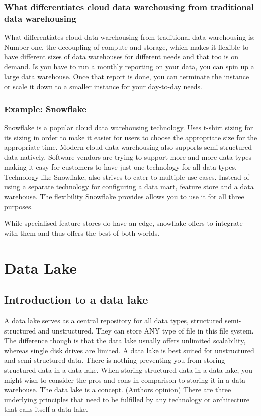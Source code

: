 \documentclass[a4paper, 11pt]{book}
\begin{document}
    \subsubsection{What differentiates cloud data warehousing from traditional data warehousing}
    What differentiates cloud data warehousing from traditional data warehousing is:
    Number one, the decoupling of compute and storage, which makes it flexible to have different sizes of data warehouses for different needs and that too is on demand.
    Is you have to run a monthly reporting on your data, you can spin up a large data warehouse.
    Once that report is done, you can terminate the instance or scale it down to a smaller instance for your day-to-day needs.

    \subsubsection{Example: Snowflake}
    Snowflake is a popular cloud data warehousing technology.
    Uses t-shirt sizing for its sizing in order to make it easier for users to choose the appropriate size for the appropriate time.
    Modern cloud data warehousing also supports semi-structured data natively.
    Software vendors are trying to support more and more data types making it easy for customers to have just one technology for all data types.
    Technology like Snowflake, also strives to cater to multiple use cases.
    Instead of using a separate technology for configuring a data mart, feature store and a data warehouse.
    The flexibility Snowflake provides allows you to use it for all three purposes.

    While specialised feature stores do have an edge, snowflake offers to integrate with them and thus offers the best of both worlds.

    \section{Data Lake}

    \subsection{Introduction to a data lake}
    A data lake serves as a central repository for all data types, structured semi-structured and unstructured.
    They can store ANY type of file in this file system.
    The difference though is that the data lake usually offers unlimited scalability, whereas single disk drives are limited.
    A data lake is best suited for unstructured and semi-structured data.
    There is nothing preventing you from storing structured data in a data lake.
    When storing structured data in a data lake, you might wish to consider the pros and cons in comparison to storing it in a data warehouse.
    The data lake is a concept.
    (Authors opinion) There are three underlying principles that need to be fulfilled by any technology or architecture that calls itself a data lake.
\end{document}

